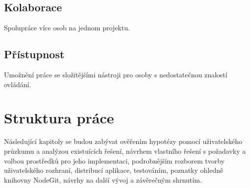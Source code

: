 \subsection{Kolaborace}

Spolupráce více osob na jednom projektu.

\subsection{Přístupnost}

Umožnění práce se složitějšími nástroji pro osoby s nedostatečnou znalostí ovládání.

\section{Struktura práce}

Následující kapitoly se budou zabývat ověřením hypotézy pomocí uživatelského průzkumu a analýzou existuících řešení, návrhem vlastního řešení s požadavky a volbou prostředků pro jeho implementaci, podrobnějším rozborem tvorby uživatelského rozhraní, distribucí aplikace, testováním, poznatky ohledně knihovny NodeGit, návrhy na další vývoj a závěrečným shrnutím.
